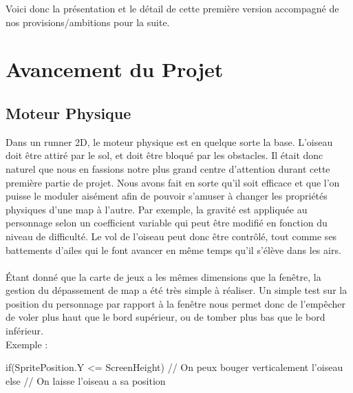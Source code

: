 \documentclass [11pt]{report}
\begin{document}
Voici donc la présentation et le détail de cette première version accompagné de nos provisions/ambitions pour la suite.



\chapter{Avancement du Projet}
	\section{Moteur Physique}
		Dans un runner 2D, le moteur physique est en quelque sorte la base. L'oiseau doit être attiré par le sol, et doit être bloqué par les obstacles. Il était donc naturel que nous en fassions notre plus grand centre d'attention durant cette première partie de projet. Nous avons fait en sorte qu'il soit efficace et que l'on puisse le moduler aisément afin de pouvoir s'amuser à changer les propriétés physiques d'une map à l'autre. Par exemple, la gravité est appliquée au personnage selon un coefficient variable qui peut être modifié en fonction du niveau de difficulté. Le vol  de l'oiseau peut donc être contrôlé, tout comme ses battements d'ailes qui le font avancer en même temps qu'il s'élève dans les airs. \\\\
		
		\indent Étant donné que la carte de jeux a les mêmes dimensions que la fenêtre, la gestion du dépassement de map a été très simple à réaliser. Un simple test sur la position du personnage par rapport à la fenêtre nous permet donc de l'empêcher de voler plus haut que le bord supérieur, ou de tomber plus bas que le bord inférieur. \\

		
		Exemple :
		
		\begin{mylisting}
		
if(SpritePosition.Y <= ScreenHeight)
{
	// On peux bouger verticalement l'oiseau
}
else
{
	// On laisse l'oiseau a sa position
}
		\end{mylisting}
	\vspace{10mm}
		
\end{document}
